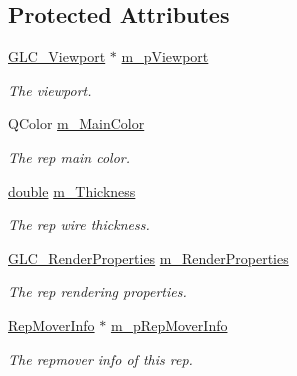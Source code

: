 \subsection*{Protected Attributes}
\begin{DoxyCompactItemize}
\item 
\hyperlink{class_g_l_c___viewport}{G\-L\-C\-\_\-\-Viewport} $\ast$ \hyperlink{class_g_l_c___rep_mover_aa8dbd5ce987ca66a4af83b412e91fc03}{m\-\_\-p\-Viewport}
\begin{DoxyCompactList}\small\item\em The viewport. \end{DoxyCompactList}\item 
Q\-Color \hyperlink{class_g_l_c___rep_mover_a89e1aa1f2afbf5c4c789ac1919ea4835}{m\-\_\-\-Main\-Color}
\begin{DoxyCompactList}\small\item\em The rep main color. \end{DoxyCompactList}\item 
\hyperlink{_super_l_u_support_8h_a8956b2b9f49bf918deed98379d159ca7}{double} \hyperlink{class_g_l_c___rep_mover_a8c836e61a72338cb4cfd2d7aa198996d}{m\-\_\-\-Thickness}
\begin{DoxyCompactList}\small\item\em The rep wire thickness. \end{DoxyCompactList}\item 
\hyperlink{class_g_l_c___render_properties}{G\-L\-C\-\_\-\-Render\-Properties} \hyperlink{class_g_l_c___rep_mover_a9c639a1544ae2867646850aca74780d0}{m\-\_\-\-Render\-Properties}
\begin{DoxyCompactList}\small\item\em The rep rendering properties. \end{DoxyCompactList}\item 
\hyperlink{struct_g_l_c___rep_mover_1_1_rep_mover_info}{Rep\-Mover\-Info} $\ast$ \hyperlink{class_g_l_c___rep_mover_a82728f2103f60fa5cbfd59e2cceaaeac}{m\-\_\-p\-Rep\-Mover\-Info}
\begin{DoxyCompactList}\small\item\em The repmover info of this rep. \end{DoxyCompactList}\end{DoxyCompactItemize}
